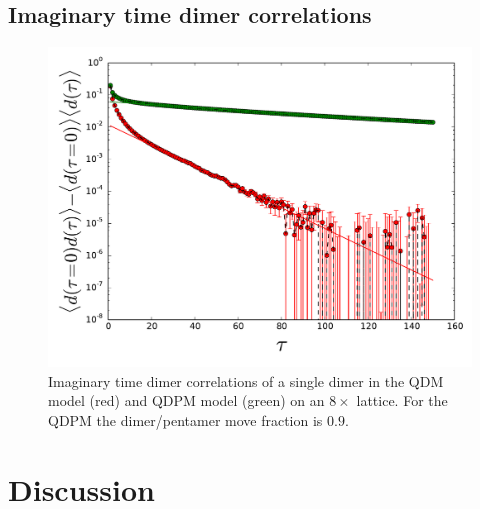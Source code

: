 \documentclass[aps,floatfix,11pt,twocolumn]{revtex4-1}
\begin{document}
    \subsection{Imaginary time dimer correlations}
    \begin{figure}[htpb]
        \centering
        \includegraphics[width=0.8\linewidth]{dimer_origin_time_cor.pdf}
        \caption{Imaginary time dimer correlations of a single dimer in the QDM model (red) and QDPM
        model (green) on an $8\times$ lattice. For the QDPM the dimer/pentamer move fraction is $0.9$. }
        \label{fig:}

    \end{figure}

\section{Discussion}
\end{document}

